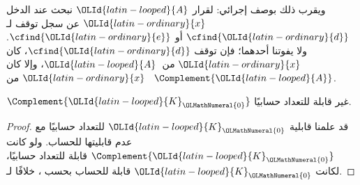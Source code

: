 \documentclass[../../../include/open-logic-section]{subfiles}
\begin{document}
\begin{explain}
ويقرب ذلك بوصف إجرائي: لقرار $\OLId{latin-looped}{A}$ نبحث عند الدخل
$\OLId{latin-ordinary}{x}$ عن سجل توقف لـ$\cfind{\OLId{latin-ordinary}{d}}$ أو $\cfind{\OLId{latin-ordinary}{e}}$. ولا يفوتنا
أحدهما؛ فإن توقف $\cfind{\OLId{latin-ordinary}{d}}$، كان $\OLId{latin-ordinary}{x}$ من~$\OLId{latin-looped}{A}$، وإلا كان $\OLId{latin-ordinary}{x}$ من
~$\Complement{\OLId{latin-looped}{A}}$.
\end{explain}

\begin{cor}
$\Complement{\OLId{latin-looped}{K}_\OLMathNumeral{0}}$ غير قابلة للتعداد حسابيًا.
\end{cor}

\begin{proof}
قد علمنا قابلية $\OLId{latin-looped}{K}_\OLMathNumeral{0}$ للتعداد حسابيًا مع عدم قابليتها للحساب. ولو كانت
$\Complement{\OLId{latin-looped}{K}_\OLMathNumeral{0}}$ قابلة للتعداد حسابيًا، لكانت $\OLId{latin-looped}{K}_\OLMathNumeral{0}$ قابلة للحساب
بحسب ، خلافًا لـ.
\end{proof}
\end{document}
